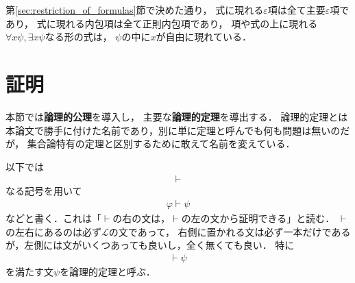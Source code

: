 	第\ref{sec:restriction_of_formulas}節で決めた通り，
	式に現れる$\varepsilon$項は全て主要$\varepsilon$項であり，
	式に現れる内包項は全て正則内包項であり，
	項や式の上に現れる$\forall x \psi,\exists x \psi$なる形の式は，
	$\psi$の中に$x$が自由に現れている．
	
\section{証明}
	本節では{\bf 論理的公理}を導入し，
	主要な{\bf 論理的定理}を導出する．
	論理的定理とは本論文で勝手に付けた名前であり，別に単に定理と呼んでも何も問題は無いのだが，
	集合論特有の定理と区別するために敢えて名前を変えている．
	
	以下では
	\begin{align}
		\vdash
	\end{align}
	なる記号を用いて
	\begin{align}
		\varphi \vdash \psi
	\end{align}
	などと書く．これは「$\vdash$の右の文は，$\vdash$の左の文から証明できる」と読む．
	$\vdash$の左右にあるのは必ず$\mathcal{L}$の文であって，
	右側に置かれる文は必ず一本だけであるが，左側には文がいくつあっても良いし，全く無くても良い．
	特に
	\begin{align}
		\vdash \psi
	\end{align}
	を満たす文$\psi$を論理的定理と呼ぶ．
	
	
	
